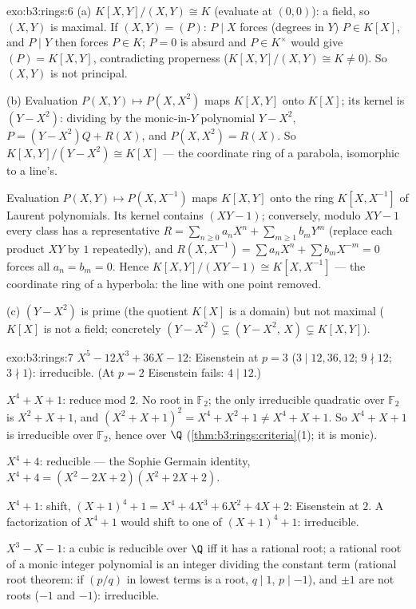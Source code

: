 \begin{solution}{exo:b3:rings:6}
(a) $K[X,Y]/(X,Y) \cong K$ (evaluate at $(0,0)$): a field, so
$(X,Y)$ is maximal. If $(X, Y) = (P)$: $P \mid X$ forces (degrees
in $Y$) $P \in K[X]$, and $P \mid Y$ then forces $P \in K$; $P =
0$ is absurd and $P \in K^\times$ would give $(P) = K[X,Y]$,
contradicting properness ($K[X,Y]/(X,Y) \cong K \neq 0$). So
$(X,Y)$ is not principal.

(b) Evaluation $P(X, Y) \mapsto P(X, X^2)$ maps $K[X,Y]$ onto
$K[X]$; its kernel is $(Y - X^2)$: dividing by the monic-in-$Y$
polynomial $Y - X^2$, $P = (Y - X^2)Q + R(X)$, and $P(X, X^2) =
R(X)$. So $K[X,Y]/(Y - X^2) \cong K[X]$ --- the coordinate ring of
a parabola, isomorphic to a line's.

Evaluation $P(X, Y) \mapsto P(X, X^{-1})$ maps $K[X, Y]$ onto the
ring $K[X, X^{-1}]$ of Laurent polynomials. Its kernel contains
$(XY - 1)$; conversely, modulo $XY - 1$ every class has a
representative $R = \sum_{n \geq 0} a_nX^n + \sum_{m \geq 1} b_m
Y^m$ (replace each product $XY$ by $1$ repeatedly), and $R(X,
X^{-1}) = \sum a_n X^n + \sum b_m X^{-m} = 0$ forces all $a_n =
b_m = 0$. Hence $K[X, Y]/(XY - 1) \cong K[X, X^{-1}]$ --- the
coordinate ring of a hyperbola: the line with one point removed.

(c) $(Y - X^2)$ is prime (the quotient $K[X]$ is a domain) but not
maximal ($K[X]$ is not a field; concretely $(Y - X^2) \subsetneq
(Y - X^2,\, X) \subsetneq K[X,Y]$).
\end{solution}

\begin{solution}{exo:b3:rings:7}
\emph{$X^5 - 12X^3 + 36X - 12$}: Eisenstein at $p = 3$ ($3 \mid
12, 36, 12$; $9 \nmid 12$; $3 \nmid 1$): irreducible. (At $p = 2$
Eisenstein fails: $4 \mid 12$.)

\emph{$X^4 + X + 1$}: reduce mod $2$. No root in $\mathbb F_2$;
the only irreducible quadratic over $\mathbb F_2$ is $X^2 + X +
1$, and $(X^2+X+1)^2 = X^4 + X^2 + 1 \neq X^4 + X + 1$. So $X^4 +
X + 1$ is irreducible over $\mathbb F_2$, hence over $\Q$
(\cref{thm:b3:rings:criteria}(1); it is monic).

\emph{$X^4 + 4$}: reducible --- the Sophie Germain identity,
$X^4 + 4 = (X^2 - 2X + 2)(X^2 + 2X + 2)$.

\emph{$X^4 + 1$}: shift, $(X+1)^4 + 1 = X^4 + 4X^3 + 6X^2 + 4X +
2$: Eisenstein at $2$. A factorization of $X^4+1$ would shift to
one of $(X+1)^4 + 1$: irreducible.

\emph{$X^3 - X - 1$}: a cubic is reducible over $\Q$ iff it has a
rational root; a rational root of a monic integer polynomial is an
integer dividing the constant term (rational root theorem: if
$(p/q)$ in lowest terms is a root, $q \mid 1$, $p \mid -1$), and
$\pm 1$ are not roots ($-1$ and $-1$): irreducible.
\end{solution}

